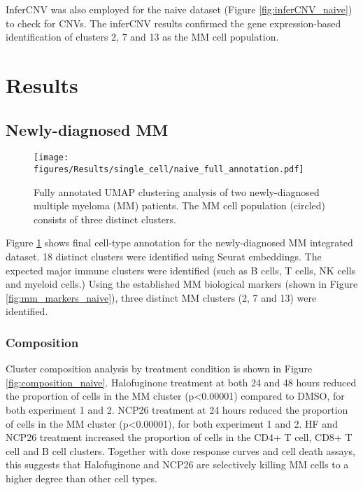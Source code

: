 InferCNV was also employed for the naive dataset (Figure \ref{fig:inferCNV_naive}) to check for CNVs.
The inferCNV results confirmed the gene expression-based identification of clusters 2, 7 and 13 as the MM cell population.

\clearpage
\section{Results}

\subsection{Newly-diagnosed MM}


\begin{figure}[hpt]
\centering
\texttt{[image: figures/Results/single\_cell/naive\_full\_annotation.pdf]}
\caption[scRNA-seq full annotation- newly-diagnosed MM]{Fully annotated UMAP clustering analysis of two newly-diagnosed multiple myeloma (MM) patients.
The MM cell population (circled) consists of three distinct clusters.}
\label{fig:full_anno_naive}
\end{figure}

Figure \ref{fig:full_anno_naive} shows final cell-type annotation for the newly-diagnosed MM integrated dataset.
18 distinct clusters were identified using Seurat embeddings.
The expected major immune clusters were identified (such as B cells, T cells, NK cells and myeloid cells.)
Using the established MM biological markers (shown in Figure \ref{fig:mm_markers_naive}), three distinct MM clusters (2, 7 and 13) were identified.

\subsubsection{Composition}
Cluster composition analysis by treatment condition is shown in Figure \ref{fig:composition_naive}.
Halofuginone treatment at both 24 and 48 hours reduced the proportion of cells in the MM cluster (p<0.00001) compared to DMSO, for both experiment 1 and 2.
NCP26 treatment at 24 hours reduced the proportion of cells in the MM cluster (p<0.00001), for both experiment 1 and 2.
HF and NCP26 treatment increased the proportion of cells in the CD4+ T cell, CD8+ T cell and B cell clusters.
Together with dose response curves and cell death assays, this suggests that Halofuginone and NCP26 are selectively killing MM cells to a higher degree than other cell types.


